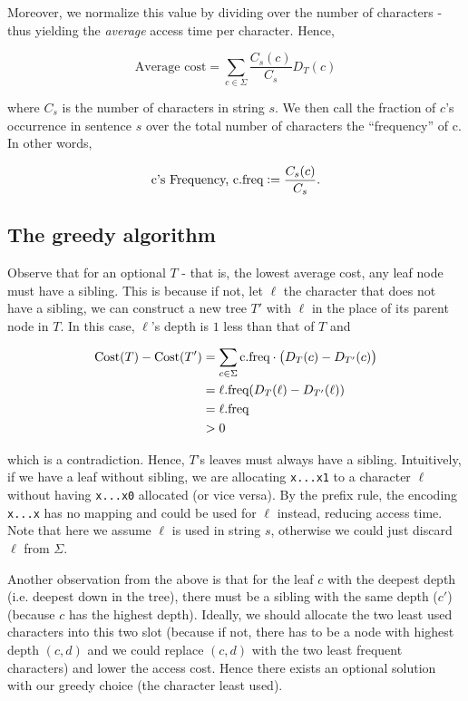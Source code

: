 Moreover, we normalize this value by dividing over the number of characters - thus yielding the \textit{average} access time per character. Hence, 

\[
    \text{Average cost} = \sum_{c \in \Sigma} \frac{C_s(c)}{C_s} D_T(c)  
\]

where $C_s$ is the number of characters in string $s$. We then call the fraction of $c$'s occurrence in sentence $s$ over the total number of characters the ``frequency'' of c. 
In other words, 

\[
    \text{c's Frequency, c.freq} := \frac{C_s(c)}{C_s}.
\]

\subsection{The greedy algorithm}

Observe that for an optional $T$ - that is, the lowest average cost, any leaf node must have a sibling. This is because if not, let $\ell$ the character that does not have a sibling, we can construct a new tree $T'$ with $\ell$ in the place of its parent node in $T$. 
In this case, $\ell$'s depth is $1$ less than that of $T$ and 

\[
\begin{split}
  \text{Cost}(T)-\text{Cost}(T') &= \sum_{c \in \Sigma} \text{c.freq}\cdot\del{ D_T(c)-D_{T'}(c)} \\
  &=\ell.\text{freq}(D_T(\ell)-D_{T'}(\ell)) \\
  &=\ell.\text{freq} \\
  &>0
\end{split}
\]

which is a contradiction. 
Hence, $T$'s leaves must always have a sibling.
Intuitively, if we have a leaf without sibling, we are allocating \texttt{x...x1} to a character $\ell$ without having \texttt{x...x0} allocated (or vice versa). 
By the prefix rule, the encoding \texttt{x...x} has no mapping and could be used for $\ell$ instead, reducing access time. 
Note that here we assume $\ell$ is used in string $s$, otherwise we could just discard $\ell$ from $\Sigma$. 

Another observation from the above is that for the leaf $c$ with the deepest depth (i.e. deepest down in the tree), there must be a sibling with the same depth ($c'$) (because $c$ has the highest depth). 
Ideally, we should allocate the two least used characters into this two slot (because if not, there has to be a node with highest depth $(c, d)$ and we could replace $(c, d)$ with the two least frequent characters) and lower the access cost. 
Hence there exists an optional solution with our greedy choice (the character least used). 

